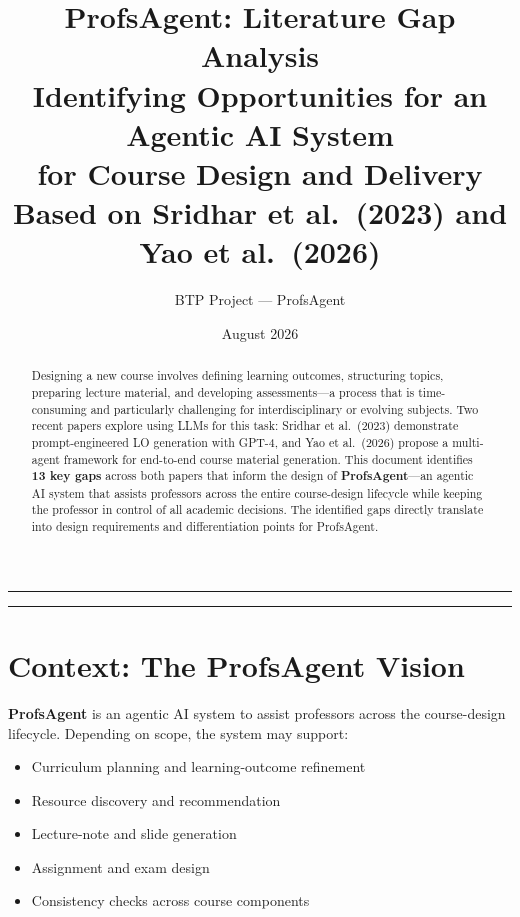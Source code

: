 \documentclass[11pt,a4paper]{article}
\title{
\vspace{-1cm}
\textbf{ProfsAgent: Literature Gap Analysis}\\[0.3cm]
\large Identifying Opportunities for an Agentic AI System\\for Course Design and Delivery\\[0.5cm]
\normalsize Based on Sridhar et al.\ (2023) and Yao et al.\ (2026)
}
\author{
BTP Project --- ProfsAgent
}
\date{August 2026}
\begin{document}
\maketitle
\thispagestyle{fancy}

\begin{abstract}
Designing a new course involves defining learning outcomes, structuring topics, preparing lecture material, and developing assessments---a process that is time-consuming and particularly challenging for interdisciplinary or evolving subjects. Two recent papers explore using LLMs for this task: Sridhar et al.\ (2023) demonstrate prompt-engineered LO generation with GPT-4, and Yao et al.\ (2026) propose a multi-agent framework for end-to-end course material generation. This document identifies \textbf{13 key gaps} across both papers that inform the design of \textbf{ProfsAgent}---an agentic AI system that assists professors across the entire course-design lifecycle while keeping the professor in control of all academic decisions. The identified gaps directly translate into design requirements and differentiation points for ProfsAgent.
\end{abstract}

\noindent\rule{\textwidth}{0.4pt}
\tableofcontents
\noindent\rule{\textwidth}{0.4pt}
\vspace{0.3cm}

\section{Context: The ProfsAgent Vision}

\textbf{ProfsAgent} is an agentic AI system to assist professors across the course-design lifecycle. Depending on scope, the system may support:

\begin{itemize}[nosep]
    \item Curriculum planning and learning-outcome refinement
    \item Resource discovery and recommendation
    \item Lecture-note and slide generation
    \item Assignment and exam design
    \item Consistency checks across course components
\end{itemize}
\end{document}
